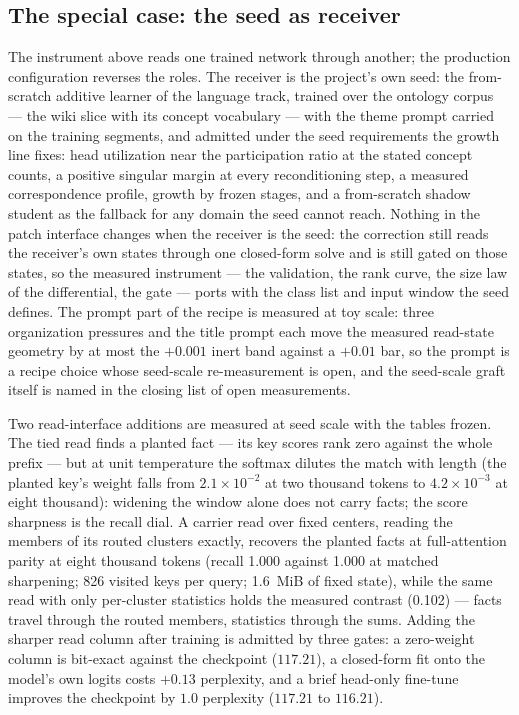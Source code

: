 \documentclass[11pt]{article}
\begin{document}
\subsection{The special case: the seed as receiver}

The instrument above reads one trained network through another;
the production configuration reverses the roles. The receiver is
the project's own seed: the from-scratch additive learner of the
language track, trained over the ontology corpus --- the wiki
slice with its concept vocabulary --- with the theme prompt
carried on the training segments, and admitted under the seed
requirements the growth line fixes: head utilization near the
participation ratio at the stated concept counts, a positive
singular margin at every reconditioning step, a measured
correspondence profile, growth by frozen stages, and a
from-scratch shadow student as the fallback for any domain the
seed cannot reach. Nothing in the patch interface changes when
the receiver is the seed: the correction still reads the
receiver's own states through one closed-form solve and is still
gated on those states, so the measured instrument --- the
validation, the rank curve, the size law of the differential,
the gate --- ports with the class list and input window the seed
defines. The prompt part of the recipe is measured at toy scale:
three organization pressures and the title prompt each move the
measured read-state geometry by at most the $+0.001$ inert band
against a $+0.01$ bar, so the prompt is a recipe choice whose
seed-scale re-measurement is open, and the seed-scale graft
itself is named in the closing list of open measurements.

Two read-interface additions are measured at seed scale with the
tables frozen. The tied read finds a planted fact --- its key
scores rank zero against the whole prefix --- but at unit
temperature the softmax dilutes the match with length (the
planted key's weight falls from $2.1\times10^{-2}$ at two
thousand tokens to $4.2\times10^{-3}$ at eight thousand):
widening the window alone does not carry facts; the score
sharpness is the recall dial. A carrier read over fixed centers,
reading the members of its routed clusters exactly, recovers the
planted facts at full-attention parity at eight thousand tokens
(recall 1.000 against 1.000 at matched sharpening; 826 visited
keys per query; 1.6~MiB of fixed state), while the same read
with only per-cluster statistics holds the measured contrast
(0.102) --- facts travel through the routed members, statistics
through the sums. Adding the sharper read column after training
is admitted by three gates: a zero-weight column is bit-exact
against the checkpoint ($117.21$), a closed-form fit onto the
model's own logits costs $+0.13$ perplexity, and a brief
head-only fine-tune improves the checkpoint by $1.0$ perplexity
($117.21$ to $116.21$).
\end{document}
